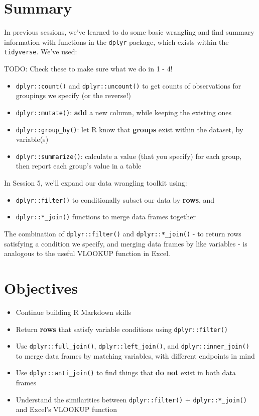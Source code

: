 \documentclass[]{book}
\providecommand{\tightlist}{%
  \setlength{\itemsep}{0pt}\setlength{\parskip}{0pt}}
\begin{document}
\hypertarget{summary-1}{%
\section{Summary}\label{summary-1}}

In previous sessions, we've learned to do some basic wrangling and find summary information with functions in the \texttt{dplyr} package, which exists within the \texttt{tidyverse}. We've used:

TODO: Check these to make sure what we do in 1 - 4!

\begin{itemize}
\tightlist
\item
  \texttt{dplyr::count()} and \texttt{dplyr::uncount()} to get counts of observations for groupings we specify (or the reverse!)
\item
  \texttt{dplyr::mutate()}: \textbf{add} a new column, while keeping the existing ones
\item
  \texttt{dplyr::group\_by()}: let R know that \textbf{groups} exist within the dataset, by variable(s)
\item
  \texttt{dplyr::summarize()}: calculate a value (that you specify) for each group, then report each group's value in a table
\end{itemize}

In Session 5, we'll expand our data wrangling toolkit using:

\begin{itemize}
\tightlist
\item
  \texttt{dplyr::filter()} to conditionally subset our data by \textbf{rows}, and
\item
  \texttt{dplyr::*\_join()} functions to merge data frames together
\end{itemize}

The combination of \texttt{dplyr::filter()} and \texttt{dplyr::*\_join()} - to return rows satisfying a condition we specify, and merging data frames by like variables - is analogous to the useful VLOOKUP function in Excel.

\hypertarget{objectives-3}{%
\section{Objectives}\label{objectives-3}}

\begin{itemize}
\tightlist
\item
  Continue building R Markdown skills
\item
  Return \textbf{rows} that satisfy variable conditions using \texttt{dplyr::filter()}
\item
  Use \texttt{dplyr::full\_join()}, \texttt{dplyr::left\_join()}, and \texttt{dplyr::inner\_join()} to merge data frames by matching variables, with different endpoints in mind
\item
  Use \texttt{dplyr::anti\_join()} to find things that \textbf{do not} exist in both data frames
\item
  Understand the similarities between \texttt{dplyr::filter()} + \texttt{dplyr::*\_join()} and Excel's VLOOKUP function
\end{itemize}
\end{document}
